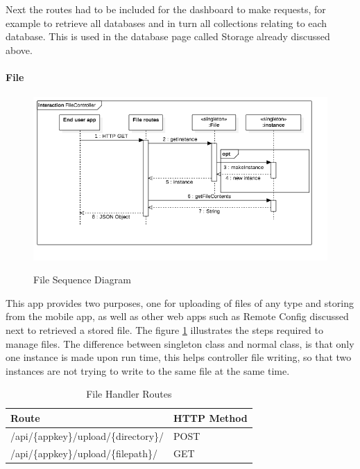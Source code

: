 Next the routes had to be included for the dashboard to make requests, for example to retrieve all databases and in turn all collections relating to each database. This is used in the database page called Storage already discussed above. 

\paragraph{File}

\begin{figure}[!h]
    \caption{File Sequence Diagram}
    \centering
    \includegraphics[width=150mm]{images/sequence/FileController}
    \label{fig:file-seq}
\end{figure}

This app provides two purposes, one for uploading of files of any type and storing from the mobile app, as well as other web apps such as Remote Config discussed next to retrieved a stored file. The figure \ref{fig:file-seq} illustrates the steps required to manage files. The difference between singleton class and normal class, is that only one instance is made upon run time, this helps controller file writing, so that two instances are not trying to write to the same file at the same time.

\begin{table}[!h]
\centering
\caption{File Handler Routes}
\label{tb:file-routes}
\begin{tabular}{|l|l|}
\hline
\rowcolor{green!20}
Route                                        & HTTP Method \\ \hline
/api/\{appkey\}/upload/\{directory\}/          & POST        \\ \hline
/api/\{appkey\}/upload/\{filepath\}/ & GET         \\ \hline
\end{tabular}
\end{table}


